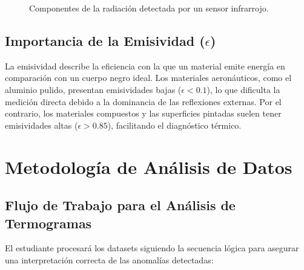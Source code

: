\documentclass[11pt, a4paper]{article}
\begin{document}
\begin{figure}[htbp]
    \centering
    \caption{Componentes de la radiación detectada por un sensor infrarrojo.}
\end{figure}

\subsection{Importancia de la Emisividad ($\epsilon$)}
La emisividad describe la eficiencia con la que un material emite energía en comparación con un cuerpo negro ideal. Los materiales aeronáuticos, como el aluminio pulido, presentan emisividades bajas ($\epsilon < 0.1$), lo que dificulta la medición directa debido a la dominancia de las reflexiones externas. Por el contrario, los materiales compuestos y las superficies pintadas suelen tener emisividades altas ($\epsilon > 0.85$), facilitando el diagnóstico térmico.

\section{Metodología de Análisis de Datos}

\subsection{Flujo de Trabajo para el Análisis de Termogramas}
El estudiante procesará los datasets siguiendo la secuencia lógica para asegurar una interpretación correcta de las anomalías detectadas:
\end{document}
